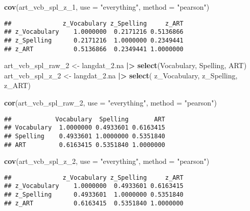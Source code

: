 \documentclass[
]{article}
\newenvironment{Shaded}{\begin{snugshade}}{\end{snugshade}}
\newcommand{\AttributeTok}[1]{\textcolor[rgb]{0.13,0.29,0.53}{#1}}
\newcommand{\FunctionTok}[1]{\textcolor[rgb]{0.13,0.29,0.53}{\textbf{#1}}}
\newcommand{\NormalTok}[1]{#1}
\newcommand{\OtherTok}[1]{\textcolor[rgb]{0.56,0.35,0.01}{#1}}
\newcommand{\SpecialCharTok}[1]{\textcolor[rgb]{0.81,0.36,0.00}{\textbf{#1}}}
\newcommand{\StringTok}[1]{\textcolor[rgb]{0.31,0.60,0.02}{#1}}
\begin{document}
\begin{Shaded}
\begin{Highlighting}[]
\FunctionTok{cov}\NormalTok{(art\_vcb\_spl\_z\_1, }\AttributeTok{use =} \StringTok{"everything"}\NormalTok{, }\AttributeTok{method =} \StringTok{"pearson"}\NormalTok{) }
\end{Highlighting}
\end{Shaded}

\begin{verbatim}
##              z_Vocabulary z_Spelling     z_ART
## z_Vocabulary    1.0000000  0.2171216 0.5136866
## z_Spelling      0.2171216  1.0000000 0.2349441
## z_ART           0.5136866  0.2349441 1.0000000
\end{verbatim}

\begin{Shaded}
\begin{Highlighting}[]
\NormalTok{art\_vcb\_spl\_raw\_2 }\OtherTok{\textless{}{-}}\NormalTok{ langdat\_2.na }\SpecialCharTok{|\textgreater{}} \FunctionTok{select}\NormalTok{(Vocabulary, Spelling, ART)}
\NormalTok{art\_vcb\_spl\_z\_2 }\OtherTok{\textless{}{-}}\NormalTok{ langdat\_2.na }\SpecialCharTok{|\textgreater{}} \FunctionTok{select}\NormalTok{( z\_Vocabulary, z\_Spelling, z\_ART) }

\FunctionTok{cor}\NormalTok{(art\_vcb\_spl\_raw\_2, }\AttributeTok{use =} \StringTok{"everything"}\NormalTok{, }\AttributeTok{method =} \StringTok{"pearson"}\NormalTok{) }
\end{Highlighting}
\end{Shaded}

\begin{verbatim}
##            Vocabulary  Spelling       ART
## Vocabulary  1.0000000 0.4933601 0.6163415
## Spelling    0.4933601 1.0000000 0.5351840
## ART         0.6163415 0.5351840 1.0000000
\end{verbatim}

\begin{Shaded}
\begin{Highlighting}[]
\FunctionTok{cov}\NormalTok{(art\_vcb\_spl\_z\_2, }\AttributeTok{use =} \StringTok{"everything"}\NormalTok{, }\AttributeTok{method =} \StringTok{"pearson"}\NormalTok{) }
\end{Highlighting}
\end{Shaded}

\begin{verbatim}
##              z_Vocabulary z_Spelling     z_ART
## z_Vocabulary    1.0000000  0.4933601 0.6163415
## z_Spelling      0.4933601  1.0000000 0.5351840
## z_ART           0.6163415  0.5351840 1.0000000
\end{verbatim}
\end{document}
